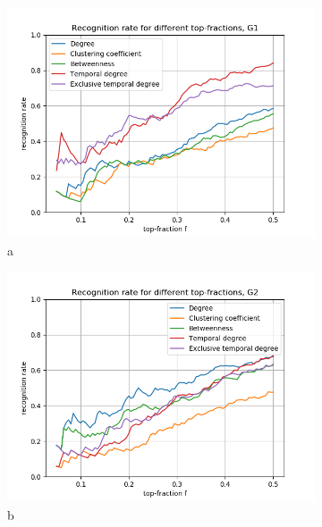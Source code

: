 \documentclass[letterpaper]{article}
\begin{document}
\begin{figure}
    \centering
    \begin{subfigure}[b]{0.32\textwidth}
        \includegraphics[width=\textwidth]{img/rankG.png}
        \caption{a}
	    \label{fig:degree_distribution_linlin}
    \end{subfigure}
    \begin{subfigure}[b]{0.32\textwidth}
        \includegraphics[width=\textwidth]{img/rankG2.png}
        \caption{b}
	    \label{fig:degree_distribution_loglog}
    \end{subfigure}
    \begin{subfigure}[b]{0.32\textwidth}

\end{subfigure}
\end{figure}
\end{document}
